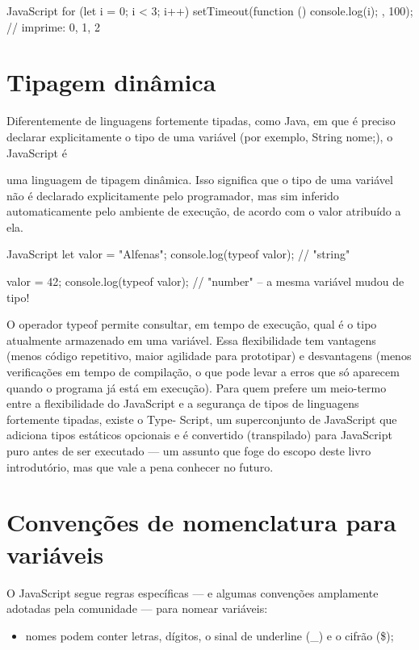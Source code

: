 \begin{codebox}{JavaScript}
for (let i = 0; i < 3; i++) {
  setTimeout(function () {
    console.log(i);
  }, 100);
}
// imprime: 0, 1, 2
\end{codebox}

\section{Tipagem dinâmica}

Diferentemente de linguagens fortemente tipadas, como Java, em que é preciso declarar explicitamente o tipo de uma variável (por exemplo, String nome;), o JavaScript é

uma linguagem de tipagem dinâmica. Isso significa que o tipo de uma variável não é declarado explicitamente pelo programador, mas sim inferido automaticamente pelo ambiente de execução, de acordo com o valor atribuído a ela.

\begin{codebox}{JavaScript}
let valor = "Alfenas";
console.log(typeof valor); // "string"

valor = 42;
console.log(typeof valor); // "number" -- a mesma variável mudou de tipo!
\end{codebox}

O operador typeof permite consultar, em tempo de execução, qual é o tipo atualmente armazenado em uma variável. Essa flexibilidade tem vantagens (menos código repetitivo, maior agilidade para prototipar) e desvantagens (menos verificações em tempo de compilação, o que pode levar a erros que só aparecem quando o programa já está em execução). Para quem prefere um meio-termo entre a flexibilidade do JavaScript e a segurança de tipos de linguagens fortemente tipadas, existe o Type- Script, um superconjunto de JavaScript que adiciona tipos estáticos opcionais e é convertido (transpilado) para JavaScript puro antes de ser executado — um assunto que foge do escopo deste livro introdutório, mas que vale a pena conhecer no futuro.

\section{Convenções de nomenclatura para variáveis}

O JavaScript segue regras específicas — e algumas convenções amplamente adotadas pela comunidade — para nomear variáveis:

\begin{itemize}
  \item nomes podem conter letras, dígitos, o sinal de underline (\_) e o cifrão (\$);
\end{itemize}

